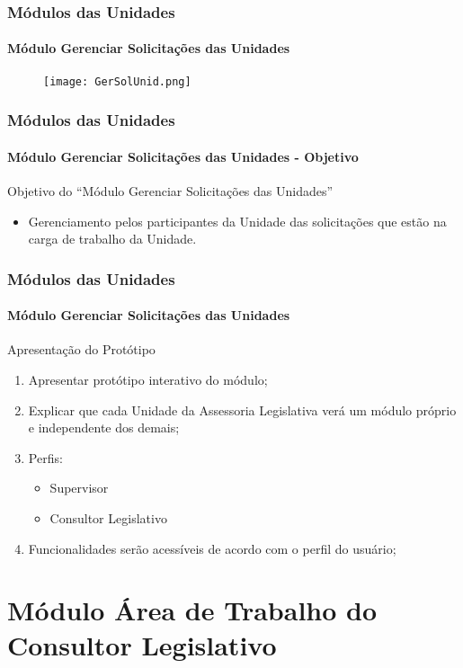 \begin{frame}
	\frametitle{Módulos das Unidades}
	\framesubtitle{Módulo Gerenciar Solicitações das Unidades}
	\begin{figure}
		\texttt{[image: GerSolUnid.png]}
	\end{figure}
\end{frame}
\begin{frame}
	\frametitle{Módulos das Unidades}
	\framesubtitle{Módulo Gerenciar Solicitações das Unidades - Objetivo}
	
	\begin{exampleblock}{Objetivo do ``Módulo Gerenciar Solicitações das Unidades''} 
		\begin{itemize}
			\item Gerenciamento pelos participantes da Unidade das solicitações que estão na carga de trabalho da Unidade.
		\end{itemize}
	\end{exampleblock}
\end{frame}
\begin{frame}
	\frametitle{Módulos das Unidades}
	\framesubtitle{Módulo Gerenciar Solicitações das Unidades}
	
	\begin{block}{Apresentação do Protótipo} %
		\begin{enumerate}
			\item Apresentar protótipo interativo do módulo;
			\item Explicar que cada Unidade da Assessoria Legislativa verá um módulo próprio e independente dos demais;
			\item Perfis:
			\begin{itemize}
				\item Supervisor
				\item Consultor Legislativo
			\end{itemize}
			
			\item Funcionalidades serão acessíveis de acordo com o perfil do usuário;
		\end{enumerate}
	\end{block}
\end{frame}
\section{Módulo Área de Trabalho do Consultor Legislativo}

